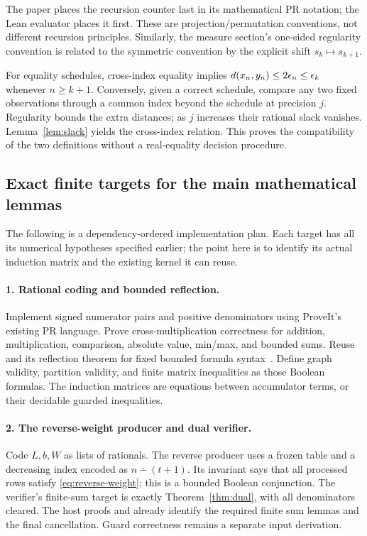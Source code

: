 The paper places the recursion counter last in its mathematical PR notation; the Lean evaluator places it first. These are projection/permutation conventions, not different recursion principles. Similarly, the measure section's one-sided regularity convention is related to the symmetric convention by the explicit shift $s_k\mapsto s_{k+1}$.

For equality schedules, cross-index equality implies
$d(x_n,y_n)\le2\epsilon_n\le\epsilon_k$ whenever $n\ge k+1$. Conversely, given a correct schedule, compare any two fixed observations through a common index beyond the schedule at precision $j$. Regularity bounds the extra distances; as $j$ increases their rational slack vanishes. Lemma~\ref{lem:slack} yields the cross-index relation. This proves the compatibility of the two definitions without a real-equality decision procedure.

\subsection{Exact finite targets for the main mathematical lemmas}

The following is a dependency-ordered implementation plan. Each target has all its numerical hypotheses specified earlier; the point here is to identify its actual induction matrix and the existing kernel it can reuse.

\paragraph{1. Rational coding and bounded reflection.}
Implement signed numerator pairs and positive denominators using ProveIt's existing PR language. Prove cross-multiplication correctness for addition, multiplication, comparison, absolute value, min/max, and bounded sums. Reuse  and its reflection theorem for fixed bounded formula syntax~\cite{repo-interfaces}. Define graph validity, partition validity, and finite matrix inequalities as those Boolean formulas. The induction matrices are equations between accumulator terms, or their decidable guarded inequalities.

\paragraph{2. The reverse-weight producer and dual verifier.}
Code $L,b,W$ as lists of rationals. The reverse producer uses a frozen table and a decreasing index encoded as $n\dotminus(t+1)$. Its invariant says that all processed rows satisfy \eqref{eq:reverse-weight}; this is a bounded Boolean conjunction. The verifier's finite-sum target is exactly Theorem~\ref{thm:dual}, with all denominators cleared. The host proofs  and  already identify the required finite sum lemmas and the final cancellation. Guard correctness remains a separate input derivation.

